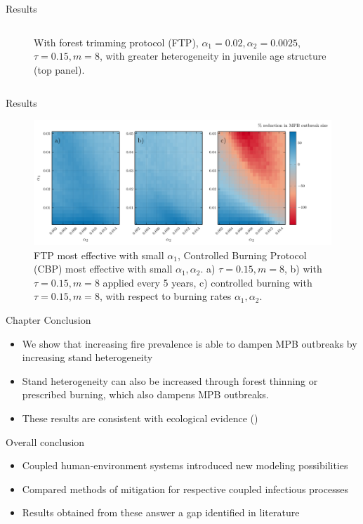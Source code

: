 \documentclass{beamer}
\begin{document}
\begin{frame}{Results}
\begin{columns}
\begin{column}[]{0.5\textwidth}
\begin{figure}
                \caption{\small With forest trimming protocol (FTP), $\alpha_1 = 0.02, \alpha_2 = 0.0025$, $\tau = 0.15, m = 8$, with greater heterogeneity in juvenile age structure (top panel).}
            \end{figure}
        \end{column}
    \end{columns}
\end{frame}


\begin{frame}{Results}
    \begin{figure}
        \includegraphics[width=\textwidth]{mpb/a1_a2_trim_gain.pdf}
        \caption{FTP most effective with small $\alpha_1$, Controlled Burning Protocol (CBP) most effective with small $\alpha_1, \alpha_2$.  a) $\tau = 0.15, m = 8$, b) with $\tau = 0.15, m = 8$ applied every 5 years, c) controlled burning with $\tau = 0.15, m = 8$,  with respect to burning rates $\alpha_1,\alpha_2$.}
    \end{figure}
\end{frame} 

\begin{frame}{Chapter Conclusion}
    \begin{itemize}
        \item We show that increasing fire prevalence is able to dampen MPB outbreaks by increasing stand heterogeneity 
        \item Stand heterogeneity can also be increased through forest thinning or prescribed burning, which also dampens MPB outbreaks.
        \item These results are consistent with ecological evidence (\citet{seidl2016spatial,kaufmann2008status})
    \end{itemize}
\end{frame}


\begin{frame}{Overall conclusion}
\begin{itemize}
    \item Coupled human-environment systems introduced new modeling possibilities
    \item Compared methods of mitigation for respective coupled infectious processes
    \item Results obtained from these answer a gap identified in literature
\end{itemize}
\end{frame}
\end{document}
